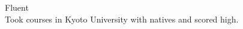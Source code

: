 \documentclass[10pt]{article} %
\begin{document}
{
Fluent\\
Took courses in Kyoto University with natives and scored high.
}

%
%
%
%
%
%

%
%
\end{document}
